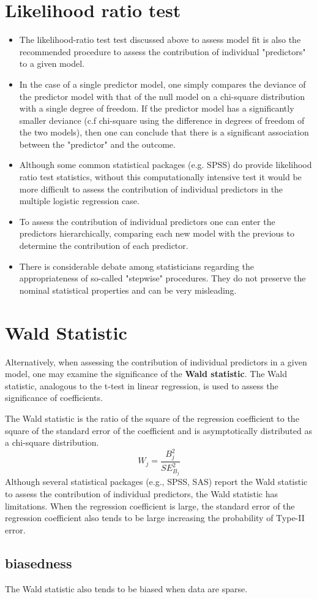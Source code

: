 \documentclass[]{article}
\begin{document}
\tableofcontents
\newpage
\section{Likelihood ratio test}
\begin{itemize}
\item The likelihood-ratio test test discussed above to assess model fit is also the recommended procedure to assess the contribution of individual "predictors" to a given model.

\item In the case of a single predictor model, one simply compares the deviance of the predictor model with that of the null model on a chi-square distribution with a single degree of freedom. If the predictor model has a significantly smaller deviance (c.f chi-square using the difference in degrees of freedom of the two models), then one can conclude that there is a significant association between the "predictor" and the outcome. 
\item Although some common statistical packages (e.g. SPSS) do provide likelihood ratio test statistics, without this computationally intensive test it would be more difficult to assess the contribution of individual predictors in the multiple logistic regression case. 
\item To assess the contribution of individual predictors one can enter the predictors hierarchically, comparing each new model with the previous to determine the contribution of each predictor.
\item There is considerable debate among statisticians regarding the appropriateness of so-called "stepwise" procedures. They do not preserve the nominal statistical properties and can be very misleading.
\end{itemize}
\newpage
\section{Wald Statistic}
Alternatively, when assessing the contribution of individual predictors in a given model, one may examine the significance of the \textbf{Wald statistic}. The Wald statistic, analogous to the t-test in linear regression, is used to assess the significance of coefficients. 
\newline

\noindent The Wald statistic is the ratio of the square of the regression coefficient to the square of the standard error of the coefficient and is asymptotically distributed as a chi-square distribution.
\[
W_j = \frac{B^2_j} {SE^2_{B_j}}
\]
Although several statistical packages (e.g., SPSS, SAS) report the Wald statistic to assess the contribution of individual predictors, the Wald statistic has limitations. When the regression coefficient is large, the standard error of the regression coefficient also tends to be large increasing the probability of Type-II error. 

\subsection{biasedness}
The Wald statistic also tends to be biased when data are sparse.
\end{document}
